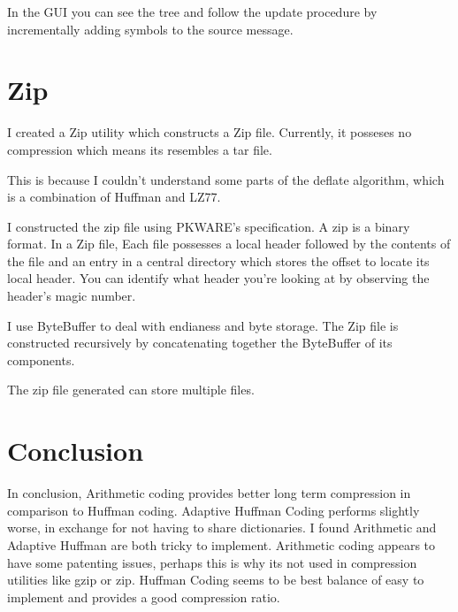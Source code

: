 \documentclass{article}
\begin{document}
In the GUI you can see the tree and follow the update procedure by incrementally adding symbols to the source message.

\section{Zip}

I created a Zip utility which constructs a Zip file. Currently, it posseses no compression which means its resembles a tar file.

This is because I couldn't understand some parts of the deflate algorithm, which is a combination of Huffman and LZ77.

I constructed the zip file using PKWARE's specification. A zip is a binary format. In a Zip file, Each file possesses a local header followed by the contents of the file and an entry in a central directory which stores the offset to locate its local header. You can identify what header you're looking at by observing the header's magic number.

I use ByteBuffer to deal with endianess and byte storage. The Zip file is constructed recursively by concatenating together the ByteBuffer of its components.

The zip file generated can store multiple files. 

\section{Conclusion}

In conclusion, Arithmetic coding provides better long term compression in comparison to Huffman coding. Adaptive Huffman Coding performs slightly worse, in exchange for not having to share dictionaries. I found Arithmetic and Adaptive Huffman are both tricky to implement. Arithmetic coding appears to have some patenting issues, perhaps this is why its not used in compression utilities like gzip or zip. Huffman Coding seems to be best balance of easy to implement and provides a good compression ratio.
\end{document}
